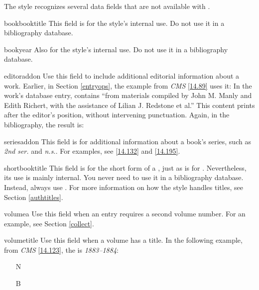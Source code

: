 \documentclass[11pt,letterpaper,oneside]{article}
\begin{document}
The style recognizes several data fields that are not available with
\biblatex.

\begin{marglist}

\item[bookbooktitle] This field is for the style's internal use. Do
not use it in a bibliography database.

\item[bookyear] Also for the style's internal use. Do not use it in a
bibliography database.

\item[editoraddon] Use this field to include additional editorial
information about a work. Earlier, in Section \ref{entryops}, the
example from \textit{CMS} \ref{14.89} uses it: In the work's database
entry,  contains ``from materials compiled by
John M. Manly and Edith Richert, with the assistance of Lilian J.
Redstone et al.'' This content prints after the editor's position,
without intervening punctuation. Again, in the bibliography, the
result is:

\begin{itemize}
\item[] 
\end{itemize}

\item[seriesaddon] This field is for additional information about a
book's series, such as \textit{2nd ser.} and \textit{n.s.}. For
examples, see \ref{14.132} and \ref{14.195}.

\item[shortbooktitle] This field is for the short form of a
, just as  is for
. Nevertheless, its use is mainly internal. You never
need to use it in a bibliography database. Instead, always use
. For more information on how the style handles
titles, see Section \ref{authtitles}.

\item[volumea] Use this field when an entry requires a second volume
number. For an example, see Section \ref{collect}.

\item[volumetitle] Use this field when a volume has a title. In the
following example, from \textit{CMS} \ref{14.123}, the
 is \textit{1883--1884}:

\begin{itemize}
\item[N] 

\item[B] 
\end{itemize}

\end{marglist}
\end{document}
